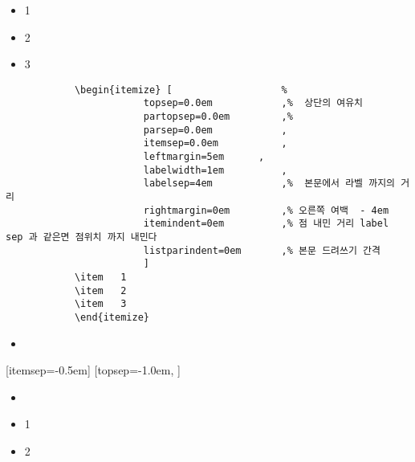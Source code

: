 \documentclass[12pt, a4paper, oneside]{book}
\begin{document}
			\begin{itemize}	[					%
						topsep=0.0em 			,%
						partopsep=0.0em 		,%
						parsep=0.0em 			, 
						itemsep=0.0em 			, 
						leftmargin=5em 		,
						labelwidth=1em 			, 
						labelsep=4em 			,%
						rightmargin=0em 		,%
						itemindent=0em 			,%
						listparindent=0em 		,%
						]
			\item	1
			\item	2
			\item	3
			\end{itemize}

		\begin{mdframed}[style=code_document, frametitle={code}]
			\begin{verbatim}
			\begin{itemize}	[					%
						topsep=0.0em 			,%  상단의 여유치
						partopsep=0.0em 		,%  
						parsep=0.0em 			, 
						itemsep=0.0em 			, 
						leftmargin=5em 		,
						labelwidth=1em 			, 
						labelsep=4em 			,%  본문에서 라벨 까지의 거리
						rightmargin=0em 		,% 오른쪽 여백  - 4em
						itemindent=0em 			,% 점 내민 거리 label sep 과 같은면 점위치 까지 내민다
						listparindent=0em 		,% 본문 드려쓰기 간격
						]
			\item	1
			\item	2
			\item	3
			\end{itemize}
			\end{verbatim}
		\end{mdframed}



			
			\begin{itemize}[topsep=0.0em,itemsep=0.0em]
			\item	
			\end{itemize}	


			[itemsep=-0.5em]
			[topsep=-1.0em,			]


			\begin{itemize}[	topsep=0.0em,itemsep=0.0em,
							leftmargin=4em, labelsep=3em ]
			\item	
			\end{itemize}	

			
		\def\TStart{	\setlength{\fboxsep}{12pt}
					\begin{boxedminipage}[c]{1.0\linewidth}
					\begin{itemize}[topsep=0.0em,itemsep=0.0em]
					}
		\def\TEnd{	\end{itemize}	
					\end{boxedminipage}\\
					}
		\TStart
		\item 1 
		\item 2 
		\TEnd
\end{document}
